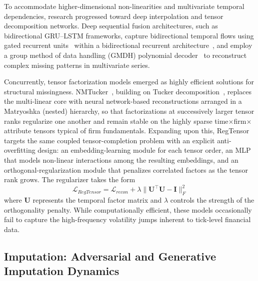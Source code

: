 To accommodate higher-dimensional non-linearities and multivariate temporal dependencies, research progressed toward deep interpolation and tensor decomposition networks. Deep sequential fusion architectures, such as bidirectional GRU--LSTM frameworks, capture bidirectional temporal flows using gated recurrent units~\citep{cho2014learning} within a bidirectional recurrent architecture~\citep{schuster1997bidirectional}, and employ a group method of data handling (GMDH) polynomial decoder~\citep{ivakhnenko1971polynomial} to reconstruct complex missing patterns in multivariate series.

Concurrently, tensor factorization models emerged as highly efficient solutions for structural missingness. NMTucker~\citep{varolgunes2023nmtucker}, building on Tucker decomposition~\citep{tucker1966some}, replaces the multi-linear core with neural network-based reconstructions arranged in a Matryoshka (nested) hierarchy, so that factorizations at successively larger tensor ranks regularize one another and remain stable on the highly sparse time$\times$firm$\times$attribute tensors typical of firm fundamentals. Expanding upon this, RegTensor~\citep{zhou2023regtensor} targets the same coupled tensor-completion problem with an explicit anti-overfitting design: an embedding-learning module for each tensor order, an MLP that models non-linear interactions among the resulting embeddings, and an orthogonal-regularization module that penalizes correlated factors as the tensor rank grows. The regularizer takes the form
\begin{equation}
\mathcal{L}_{RegTensor} = \mathcal{L}_{recon} + \lambda \|\mathbf{U}^\top \mathbf{U} - \mathbf{I}\|_F^2
\end{equation}
where $\mathbf{U}$ represents the temporal factor matrix and $\lambda$ controls the strength of the orthogonality penalty. While computationally efficient, these models occasionally fail to capture the high-frequency volatility jumps inherent to tick-level financial data.

\subsection{Imputation: Adversarial and Generative Imputation Dynamics}

